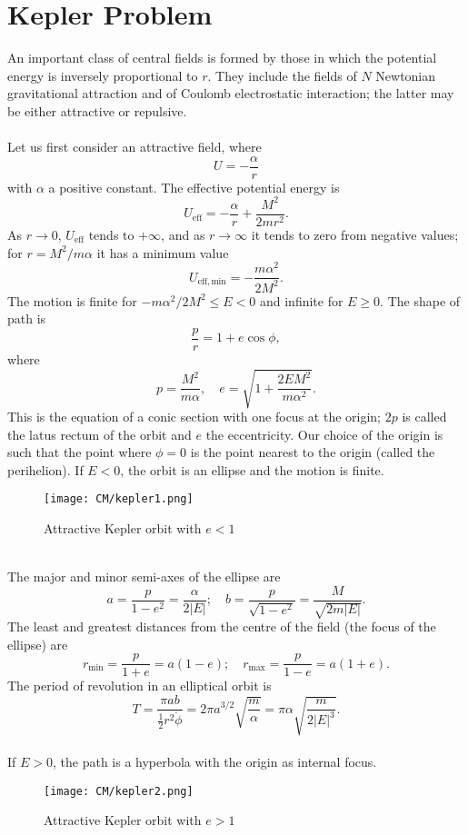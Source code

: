 \section{Kepler Problem}
An important class of central fields is formed by those in which the potential energy is inversely proportional to $r$. They include the fields of $N$ Newtonian gravitational attraction and of Coulomb electrostatic interaction; the latter may be either attractive or repulsive.
\\ \\
Let us first consider an attractive field, where
\[U = -\frac{\alpha}{r} \]
with $\alpha$ a positive constant. The effective potential energy is
\[U_{\mathrm{eff}} = -\frac{\alpha}{r} + \frac{M^2}{2mr^2}.\]
As $r \to 0$, $U_{\mathrm{eff}}$ tends to $+\infty$, and as $r \to \infty$ it tends to zero from negative values; for $r = {M^2}/{m\alpha}$ it has a minimum value
\[U_{\mathrm{eff},\mathrm{min}} = -\frac{m\alpha^2}{2M^2}.\]
The motion is finite for $-{m\alpha^2}/{2M^2} \leq E < 0$ and infinite for $E \ge 0$.
The shape of path is
\[\frac{p}{r} = 1 + e \cos \phi, \]
where
\[p = \frac{M^2}{m\alpha}, \quad e = \sqrt{1 + \frac{2EM^2}{m \alpha^2}}.\]
This is the equation of a conic section with one focus at the origin; $2p$ is called the latus rectum of the orbit and $e$ the eccentricity. Our choice of the origin is such that the point where $\phi = 0$ is the point nearest to the origin (called the perihelion).
If $E < 0$,  the orbit is an ellipse and the motion is finite.
\begin{figure}[!h]
	\centering
	\texttt{[image: CM/kepler1.png]}
	\caption{Attractive Kepler orbit with $e < 1$}
\end{figure}
\\
The major and minor semi-axes of the ellipse are
\[a = \frac{p}{1-e^2} = \frac{\alpha}{2|E|} ;\quad b = \frac{p}{\sqrt{1-e^2}} = \frac{M}{\sqrt{2m|E|}}.\]
The least and greatest distances from the centre of the field (the focus of the ellipse) are
\[r_{\mathrm{min}} = \frac{p}{1+e} = a(1-e) ;\quad r_{\mathrm{max}} = \frac{p}{1-e} = a(1+e).\]
The period of revolution in an elliptical orbit is
\[T = \frac{\pi a b}{\frac{1}{2}r^2 \dot{\phi}} = 2\pi a^{3/2}\sqrt{\frac{m}{\alpha}} = \pi \alpha \sqrt{\frac{m}{2|E|^3}}.\]
\\
If $E > 0$, the path is a hyperbola with the origin as internal focus. 
\begin{figure}[!h]
	\centering
	\texttt{[image: CM/kepler2.png]}
	\caption{Attractive Kepler orbit with $e > 1$}
\end{figure}
